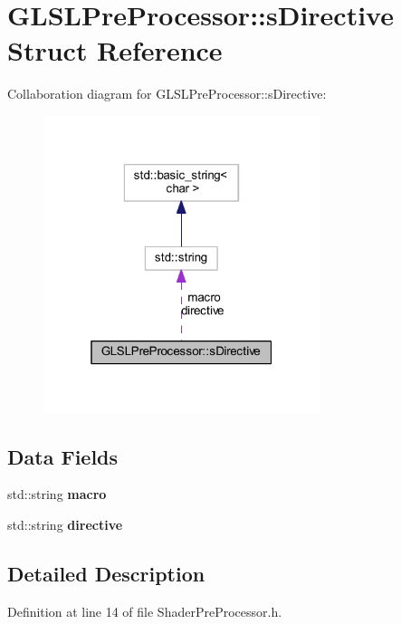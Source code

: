 \hypertarget{struct_g_l_s_l_pre_processor_1_1s_directive}{}\section{G\+L\+S\+L\+Pre\+Processor\+:\+:s\+Directive Struct Reference}
\label{struct_g_l_s_l_pre_processor_1_1s_directive}


Collaboration diagram for G\+L\+S\+L\+Pre\+Processor\+:\+:s\+Directive\+:
\nopagebreak
\begin{figure}[H]
\begin{center}
\leavevmode
\includegraphics[width=229pt]{struct_g_l_s_l_pre_processor_1_1s_directive__coll__graph}
\end{center}
\end{figure}
\subsection*{Data Fields}
\begin{DoxyCompactItemize}
\item 
std\+::string {\bfseries macro}\hypertarget{struct_g_l_s_l_pre_processor_1_1s_directive_a80007cd56962ae6f4216ede8df0277b8}{}\label{struct_g_l_s_l_pre_processor_1_1s_directive_a80007cd56962ae6f4216ede8df0277b8}

\item 
std\+::string {\bfseries directive}\hypertarget{struct_g_l_s_l_pre_processor_1_1s_directive_a20f568217b6d46c12c530f5f3b7109a9}{}\label{struct_g_l_s_l_pre_processor_1_1s_directive_a20f568217b6d46c12c530f5f3b7109a9}

\end{DoxyCompactItemize}


\subsection{Detailed Description}


Definition at line 14 of file Shader\+Pre\+Processor.\+h.

